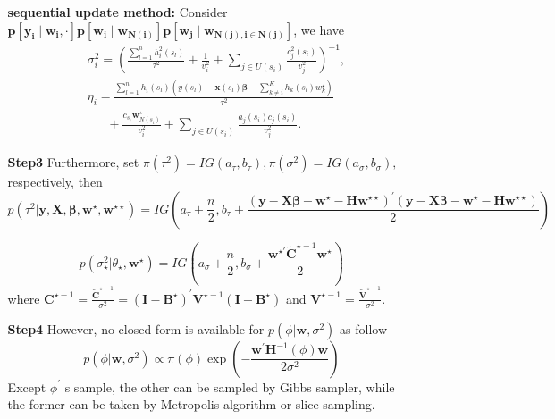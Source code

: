 \documentclass[
12pt, %
a4paper, %
oneside, %
headinclude,footinclude, %
BCOR5mm, %
]{scrartcl}
\begin{document}
\begin{itemize}
\begin{itemize}
\textbf{sequential update method:}
Consider $\boldsymbol{p\left[y_i\mid w_i, \cdot\right]p\left[w_i\mid w_{N(i)}\right]p\left[w_j\mid w_{N(j), i \in N(j)}\right]}$, we have
\begin{equation}
\begin{aligned}
&\sigma_i^2 = \left(\frac{\sum_{l = 1}^{n}h_i^2(s_l)}{\tau^2} + \frac{1}{v_i^2} +
\sum_{j \in U(s_i)}\frac{c_{j}^2(s_i)}{v_j^2} \right)^{-1}, \\&
\eta_i = \frac{\sum_{l = 1}^{n}h_i(s_l)\left(y\left(s_l\right) - \boldsymbol{x}\left(s_l\right)\boldsymbol{\beta} - \sum_{k \neq i}^{K}h_k(s_l)w_k^{\star}\right)}{\tau^{2}}\\& ~~~~~~~ + \frac{c_{s_i} \boldsymbol{w}_{N(s_i)}^{\star}}{v_i^2} + \sum_{j \in U(s_i)}\frac{a_{j}(s_i)c_j(s_i)}{v_j^2}.
\end{aligned}
 \label{Eq:Post_W_Dis}
\end{equation}


\item [\textbf{Step3}] Furthermore, set
\(\pi\left(\tau^{2}\right)=I G\left(a_{\tau}, b_{\tau}\right), \pi\left(\sigma^{2}\right)=I G\left(a_{\sigma}, b_{\sigma}\right),\)
respectively, then \begin{equation}
p\left(\tau^{2} | \boldsymbol{y}, \boldsymbol{X}, \boldsymbol{\beta}, \boldsymbol{w}^{\star}, \boldsymbol{w}^{\star\star}\right)=I G\left(a_{\tau}+\frac{n}{2}, b_{\tau}+\frac{(\boldsymbol{y}-\boldsymbol{X} \boldsymbol{\beta}-\boldsymbol{w}^{\star} -  \boldsymbol{H}\boldsymbol{w}^{\star\star})^{\prime}(\boldsymbol{y}-\boldsymbol{X} \boldsymbol{\beta}-\boldsymbol{w}^{\star}-  \boldsymbol{H}\boldsymbol{w}^{\star\star})}{2}\right)
\end{equation}

\begin{equation}
p\left(\sigma^{2}_{\star} | \theta_{\star}, \boldsymbol{w}^{\star}\right)=I G\left(a_{\sigma}+\frac{n}{2}, b_{\sigma}+\frac{\boldsymbol{w}^{\star \prime} \boldsymbol{\tilde{C}}^{\star -1} \boldsymbol{w}^{\star}}{2}\right)
\end{equation}
where $\boldsymbol{C}^{\star -1} = \frac{ \boldsymbol{\tilde{C}}^{\star -1}}{\sigma^2}  = \left(\boldsymbol{I} - \boldsymbol{B}^{\star}\right)^\prime\boldsymbol{V}^{\star - 1}\left(\boldsymbol{I} - \boldsymbol{B}^{\star}\right)$ and $\boldsymbol{V}^{\star - 1} = \frac{\boldsymbol{\tilde{V}}^{\star - 1}}{\sigma^2}.$



 \item [\textbf{Step4}] However, no closed form is available for
\(p\left(\phi | \boldsymbol{w}, \sigma^{2}\right)\) as follow
\begin{equation}
p\left(\phi | \boldsymbol{w}, \sigma^{2}\right) \propto \pi(\phi) \exp \left(-\frac{\boldsymbol{w}^{\prime} \boldsymbol{H}^{-1}(\phi) \boldsymbol{w}}{2\sigma^2}\right)
\end{equation} Except \(\phi^{\prime}\) s sample, the other can be
sampled by Gibbs sampler, while the former can be taken by Metropolis
algorithm or slice sampling.
\end{itemize}


\end{itemize}
\end{document}
